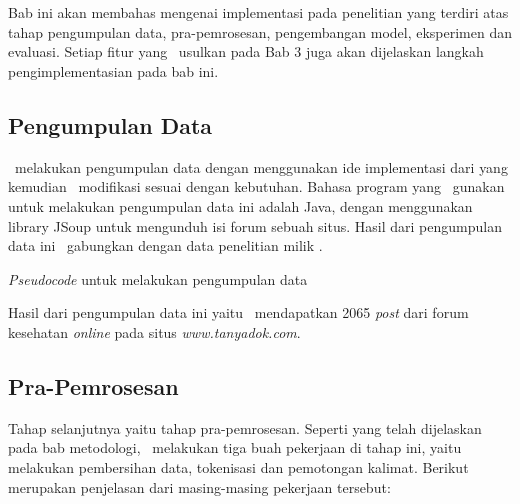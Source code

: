 \chapter{\babEmpat} \label{eksperimen}

Bab ini akan membahas mengenai implementasi pada penelitian yang terdiri atas tahap pengumpulan data, pra-pemrosesan, pengembangan model, eksperimen dan evaluasi. Setiap fitur yang \saya~usulkan pada Bab 3 juga akan dijelaskan langkah pengimplementasian pada bab ini.

\section{Pengumpulan Data}
\Saya~melakukan pengumpulan data dengan menggunakan ide implementasi dari \cite{skripsiKakRadit} yang kemudian \saya~modifikasi sesuai dengan kebutuhan. Bahasa program yang \saya~gunakan untuk melakukan pengumpulan data ini adalah Java, dengan menggunakan library JSoup untuk mengunduh isi forum sebuah situs. Hasil dari pengumpulan data ini \saya~gabungkan dengan data penelitian milik \cite{skripsiKakRadit}.

\begin{kode}\label{(kode_crawling)}
	
	\label{code:crawl}	
	\caption{\textit{Pseudocode} untuk melakukan pengumpulan data}	
\end{kode}

Hasil dari pengumpulan data ini yaitu \saya~mendapatkan 2065 \textit{post} dari forum kesehatan \textit{online} pada situs \textit{www.tanyadok.com}.

\section{Pra-Pemrosesan}
Tahap selanjutnya yaitu tahap pra-pemrosesan. Seperti yang telah dijelaskan pada bab metodologi, \saya~melakukan tiga buah pekerjaan di tahap ini, yaitu melakukan pembersihan data, tokenisasi dan pemotongan kalimat. Berikut merupakan penjelasan dari masing-masing pekerjaan tersebut:

